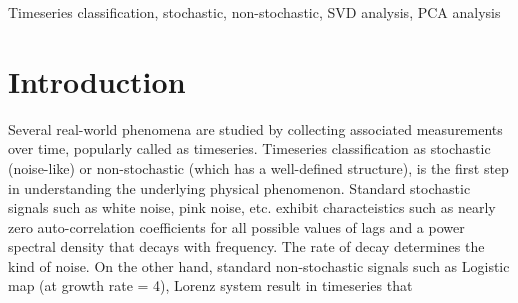 \documentclass[journal]{IEEEtran}
\begin{document}
\begin{abstract}
\end{abstract}

\begin{IEEEkeywords}
Timeseries classification, stochastic, non-stochastic, SVD analysis, PCA analysis %
\end{IEEEkeywords}


\IEEEpeerreviewmaketitle



\section{Introduction}
Several real-world phenomena are studied by collecting associated measurements over time, popularly called as timeseries. Timeseries classification as stochastic (noise-like) or non-stochastic (which has a well-defined structure), is the first step in understanding the underlying physical phenomenon. Standard stochastic signals such as white noise, pink noise, etc. exhibit characteistics such as nearly zero auto-correlation coefficients for all possible values of lags and a power spectral density that decays with frequency. The rate of decay determines the kind of noise. On the other hand, standard non-stochastic signals such as Logistic map (at growth rate = 4), Lorenz system result in timeseries that
\end{document}
